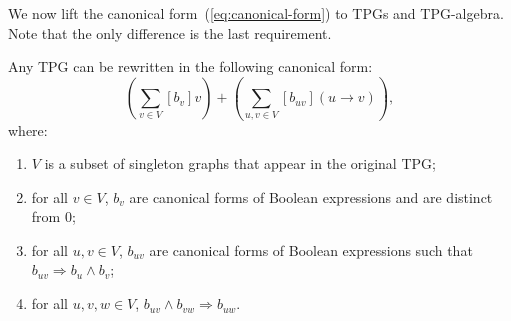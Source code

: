 We now lift the canonical form~(\ref{eq:canonical-form}) to TPGs
and TPG-algebra. Note that the only difference is the last requirement.
\begin{prop}
\label{prop:Canonical-form-tpg} Any TPG
can be rewritten in the following canonical form:
\begin{equation}
\left(\sum_{v\in V}[b_{v}]v\right)+\left(\sum_{u,v\in V}[b_{uv}](u\rightarrow v)\right),\label{eq:canonical-form-tpg}
\end{equation}
 where:
\begin{enumerate}
\item $V$ is a subset of singleton graphs that appear in the original TPG;
\item for all $v\in V$, $b_{v}$ are canonical forms of Boolean expressions
and are distinct from 0;
\item for all $u,v\in V$, $b_{uv}$ are canonical forms of Boolean expressions
such that $b_{uv}\Rightarrow b_{u}\wedge b_{v}$;
\item for all $u,v,w\in V$, $b_{uv}\wedge b_{vw}\Rightarrow b_{uw}$.
\end{enumerate}
\end{prop}
